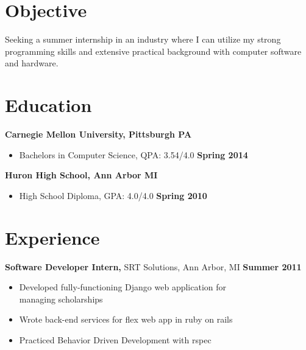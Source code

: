 \documentclass[sectioned]{dsyangres}
\begin{document}

\address{{\bf School Address} \\
  5032 forbes ave. SMC 4932 \\ Pittsburgh, PA 15289  \\
         }
\address{{\bf Home Address} \\
  5313 Betheny Circle \\
  Superior Township, MI 48198 \\
   }


\begin{resume}

\section{Objective}

Seeking a summer internship in an industry where I can utilize my strong programming
skills and extensive practical background with computer software and hardware.


\section{Education}

\textbf{Carnegie Mellon University, Pittsburgh PA}
  \begin{itemize}
    \item Bachelors in Computer Science, QPA: 3.54/4.0 \hfill \textbf{ Spring 2014}
  \end{itemize}

\textbf{Huron High School, Ann Arbor MI}
  \begin{itemize}
    \item High School Diploma, GPA: 4.0/4.0 \hfill \textbf{ Spring 2010}
  \end{itemize}


\section{Experience}

\textbf{Software Developer Intern,}
  SRT Solutions, Ann Arbor, MI \hfill \textbf{Summer 2011}

  \begin{itemize} \itemsep -2pt
    \item Developed fully-functioning Django web application for\\
      managing scholarships
    \item Wrote back-end services for flex web app in ruby
      on rails
    \item Practiced Behavior Driven Development with rspec
  \end{itemize}


\end{resume}
\end{document}
